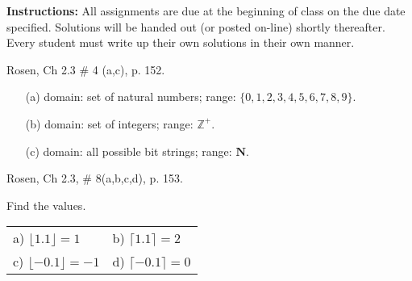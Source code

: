 \documentclass[11pt]{exam}
\begin{document}
\extrawidth{0.5in}%
\pagestyle{headandfoot}%
 \headrule
  \footrule {}

\addpoints

\noindent \textbf{Instructions:} All assignments are due at the
beginning of class on the due date specified.  Solutions will be
handed out (or posted on-line) shortly thereafter.  Every student
must write up their own solutions in their own manner.

\begin{questions}
\printanswers

\question[4] Rosen, Ch 2.3 \# 4 (a,c), p. 152.
\begin{solution}
\begin{itemize}
  \setlength{\itemsep}{1pt}
  \setlength{\parskip}{0pt}
  \setlength{\parsep}{0pt}
    \item[(a)] domain: set of natural numbers; range: $\{0, 1, 2, 3, 4, 5, 6, 7, 8, 9 \}$.
    \item[(b)] domain: set of integers; range: $\mathbb{Z}^+$.
    \item[(c)] domain: all possible bit strings; range: $\mathbf{N}$.
\end{itemize}
\end{solution}

\question[4] Rosen, Ch 2.3, \# 8(a,b,c,d), p. 153.
\begin{solution}
Find the values.

\renewcommand{\arraystretch}{1.3}
\begin{tabular}{ll}
    a) $\lfloor 1.1 \rfloor = 1$ \hspace*{0.5in} & b) $\lceil 1.1 \rceil = 2$\\
    c) $\lfloor -0.1 \rfloor = -1$ & d) $\lceil -0.1 \rceil = 0$ \\
\end{tabular}
\end{solution}



\end{questions}
\end{document}
